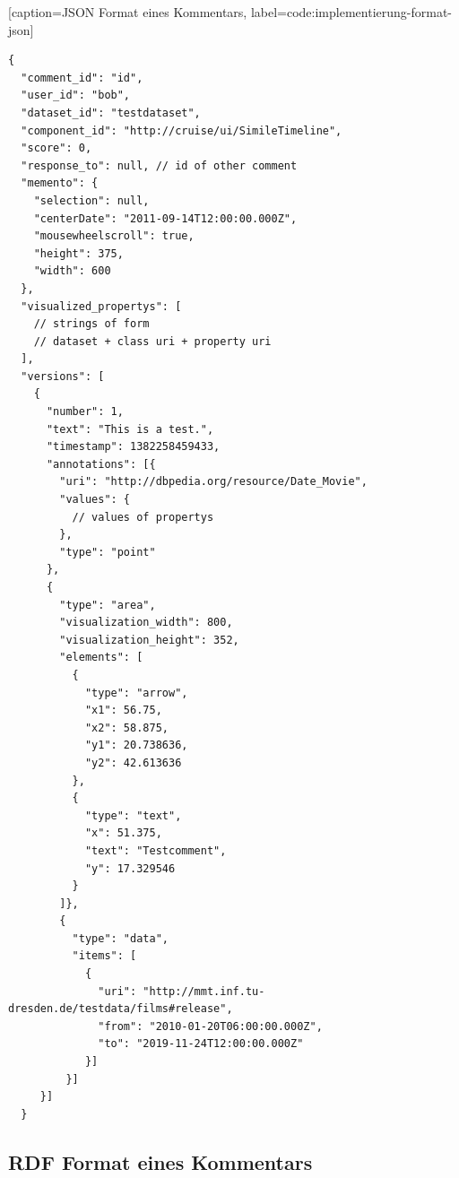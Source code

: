\documentclass[
	headsepline,
	footsepline,
	fontsize=12pt,
	bibliography=totoc
]{scrbook}
\begin{document}
\lstset{language=JSON}[caption={JSON Format eines Kommentars}, label=code:implementierung-format-json]
\begin{lstlisting}
{
  "comment_id": "id",
  "user_id": "bob",
  "dataset_id": "testdataset",
  "component_id": "http://cruise/ui/SimileTimeline",
  "score": 0,
  "response_to": null, // id of other comment
  "memento": {
    "selection": null,
    "centerDate": "2011-09-14T12:00:00.000Z",
    "mousewheelscroll": true,
    "height": 375,
    "width": 600
  },
  "visualized_propertys": [
    // strings of form
    // dataset + class uri + property uri
  ],
  "versions": [
    {
      "number": 1,
      "text": "This is a test.",
      "timestamp": 1382258459433,
      "annotations": [{
        "uri": "http://dbpedia.org/resource/Date_Movie",
        "values": {
          // values of propertys
        },
        "type": "point"
      },
      {
        "type": "area",
        "visualization_width": 800,
        "visualization_height": 352,
        "elements": [
          {
            "type": "arrow",
            "x1": 56.75,
            "x2": 58.875,
            "y1": 20.738636,
            "y2": 42.613636
          },
          {
            "type": "text",
            "x": 51.375,
            "text": "Testcomment",
            "y": 17.329546
          }
        ]},
        {
          "type": "data",
          "items": [
            {
              "uri": "http://mmt.inf.tu-dresden.de/testdata/films#release",
              "from": "2010-01-20T06:00:00.000Z",
              "to": "2019-11-24T12:00:00.000Z"
            }]
         }]
     }]
  }
\end{lstlisting}

\subsection{RDF Format eines Kommentars}
\label{appendix:implementierung:rdf}
\end{document}
